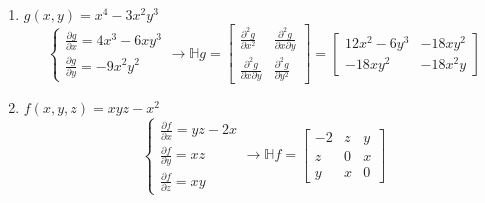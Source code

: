 \documentclass[12pt]{article}
\begin{document}
\begin{enumerate}
    \item $g(x,y) = x^4 -3x^2y^3$
    \[ \begin{cases}
        \frac{\partial g}{\partial x} = 4x^3 - 6xy^3
        \\ \frac{\partial g}{\partial y} = -9x^2y^2 
    \end{cases} \to \mathbb{H} g = \begin{bmatrix}
        \frac{\partial^2 g}{\partial x^2} & \frac{\partial^2 g}{\partial x\partial y} \\ \frac{\partial^2 g}{\partial x\partial y}& \frac{\partial^2 g}{\partial y^2}
    \end{bmatrix} = \begin{bmatrix}
        12x^2 -6y^3 & -18xy^2 \\ -18xy^2 & -18x^2y
    \end{bmatrix}
    \]
    \item $f(x,y,z) = xyz-x^2$
    \[ \begin{cases}
        \frac{\partial f }{\partial x} = yz - 2x
        \\ \frac{\partial f}{\partial y}=xz
        \\ \frac{\partial f}{\partial z} = xy
    \end{cases} \to \mathbb{H} f = \begin{bmatrix}
        -2 & z&y \\ z&0&x \\ y&x&0
    \end{bmatrix}\]
\end{enumerate}
\end{document}
